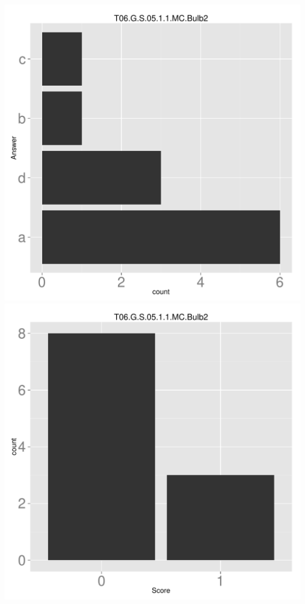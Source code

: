 \documentclass[12pt,english,nohyper]{tufte-handout}\usepackage[]{graphicx}\usepackage[]{color}
\begin{document}
\begin{center} \includegraphics[width=.45\linewidth]{Topic06_AB_76_answer} \includegraphics[width=.45\linewidth]{Topic06_AB_76_score} \end{center} 
\end{document}
